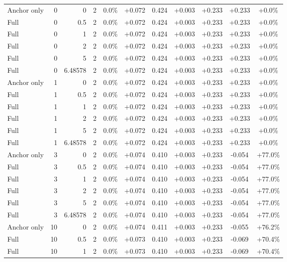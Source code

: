 \begin{table}[htbp]
\begin{tabular}{lrrrccccccc}
Anchor only & 0 & 0 & 2 & 0.0\% & +0.072 & 0.424 & +0.003 & +0.233 & +0.233 & +0.0\% \\
Full & 0 & 0.5 & 2 & 0.0\% & +0.072 & 0.424 & +0.003 & +0.233 & +0.233 & +0.0\% \\
Full & 0 & 1 & 2 & 0.0\% & +0.072 & 0.424 & +0.003 & +0.233 & +0.233 & +0.0\% \\
Full & 0 & 2 & 2 & 0.0\% & +0.072 & 0.424 & +0.003 & +0.233 & +0.233 & +0.0\% \\
Full & 0 & 5 & 2 & 0.0\% & +0.072 & 0.424 & +0.003 & +0.233 & +0.233 & +0.0\% \\
Full & 0 & 6.48578 & 2 & 0.0\% & +0.072 & 0.424 & +0.003 & +0.233 & +0.233 & +0.0\% \\
Anchor only & 1 & 0 & 2 & 0.0\% & +0.072 & 0.424 & +0.003 & +0.233 & +0.233 & +0.0\% \\
Full & 1 & 0.5 & 2 & 0.0\% & +0.072 & 0.424 & +0.003 & +0.233 & +0.233 & +0.0\% \\
Full & 1 & 1 & 2 & 0.0\% & +0.072 & 0.424 & +0.003 & +0.233 & +0.233 & +0.0\% \\
Full & 1 & 2 & 2 & 0.0\% & +0.072 & 0.424 & +0.003 & +0.233 & +0.233 & +0.0\% \\
Full & 1 & 5 & 2 & 0.0\% & +0.072 & 0.424 & +0.003 & +0.233 & +0.233 & +0.0\% \\
Full & 1 & 6.48578 & 2 & 0.0\% & +0.072 & 0.424 & +0.003 & +0.233 & +0.233 & +0.0\% \\
Anchor only & 3 & 0 & 2 & 0.0\% & +0.074 & 0.410 & +0.003 & +0.233 & -0.054 & +77.0\% \\
Full & 3 & 0.5 & 2 & 0.0\% & +0.074 & 0.410 & +0.003 & +0.233 & -0.054 & +77.0\% \\
Full & 3 & 1 & 2 & 0.0\% & +0.074 & 0.410 & +0.003 & +0.233 & -0.054 & +77.0\% \\
Full & 3 & 2 & 2 & 0.0\% & +0.074 & 0.410 & +0.003 & +0.233 & -0.054 & +77.0\% \\
Full & 3 & 5 & 2 & 0.0\% & +0.074 & 0.410 & +0.003 & +0.233 & -0.054 & +77.0\% \\
Full & 3 & 6.48578 & 2 & 0.0\% & +0.074 & 0.410 & +0.003 & +0.233 & -0.054 & +77.0\% \\
Anchor only & 10 & 0 & 2 & 0.0\% & +0.074 & 0.411 & +0.003 & +0.233 & -0.055 & +76.2\% \\
Full & 10 & 0.5 & 2 & 0.0\% & +0.073 & 0.410 & +0.003 & +0.233 & -0.069 & +70.4\% \\
Full & 10 & 1 & 2 & 0.0\% & +0.073 & 0.410 & +0.003 & +0.233 & -0.069 & +70.4\% \\

\end{tabular}
\end{table}
